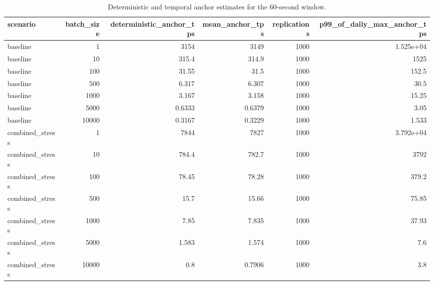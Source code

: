 \begin{table}[t]
\centering
\small
\caption{Deterministic and temporal anchor estimates for the 60-second window.}
\label{tab:estimators}
\begin{tabular}{lrrrrr}
\toprule
scenario & batch\_size & deterministic\_anchor\_tps & mean\_anchor\_tps & replications & p99\_of\_daily\_max\_anchor\_tps \\
\midrule
baseline & 1 & 3154 & 3149 & 1000 & 1.525e+04 \\
baseline & 10 & 315.4 & 314.9 & 1000 & 1525 \\
baseline & 100 & 31.55 & 31.5 & 1000 & 152.5 \\
baseline & 500 & 6.317 & 6.307 & 1000 & 30.5 \\
baseline & 1000 & 3.167 & 3.158 & 1000 & 15.25 \\
baseline & 5000 & 0.6333 & 0.6379 & 1000 & 3.05 \\
baseline & 10000 & 0.3167 & 0.3229 & 1000 & 1.533 \\
combined\_stress & 1 & 7844 & 7827 & 1000 & 3.792e+04 \\
combined\_stress & 10 & 784.4 & 782.7 & 1000 & 3792 \\
combined\_stress & 100 & 78.45 & 78.28 & 1000 & 379.2 \\
combined\_stress & 500 & 15.7 & 15.66 & 1000 & 75.85 \\
combined\_stress & 1000 & 7.85 & 7.835 & 1000 & 37.93 \\
combined\_stress & 5000 & 1.583 & 1.574 & 1000 & 7.6 \\
combined\_stress & 10000 & 0.8 & 0.7906 & 1000 & 3.8 \\
\bottomrule
\end{tabular}
\end{table}
